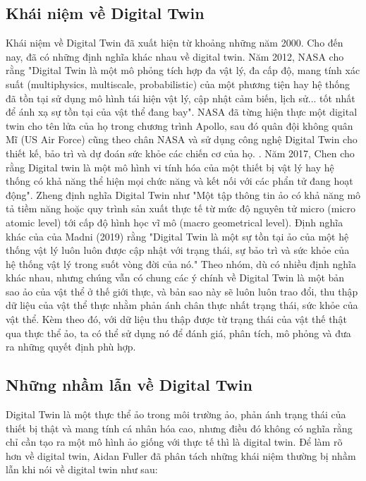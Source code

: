 \subsection{Khái niệm về Digital Twin}

Khái niệm về Digital Twin đã xuất hiện từ khoảng những năm 2000. Cho đến nay, đã có những định nghĩa khác nhau về digital twin. Năm 2012, NASA \cite{glaessgen2012digital} cho rằng "Digital Twin là một mô phỏng tích hợp đa vật lý, đa cấp độ, mang tính xác suất (multiphysics, multiscale, probabilistic) của một phương tiện hay hệ thống đã tồn tại sử dụng mô hình tái hiện vật lý, cập nhật cảm biến, lịch sử... tốt nhất để ánh xạ sự tồn tại của vật thể đang bay". NASA đã từng hiện thực một digital twin cho tên lửa của họ trong chương trình Apollo, sau đó quân đội không quân Mĩ (US Air Force) cũng theo chân NASA và sử dụng công nghệ Digital Twin cho thiết kế, bảo trì và dự đoán sức khỏe các chiến cơ của họ. \cite{singh_origin_to_future}. Năm 2017, Chen \cite{chen2017integrated} cho rằng Digital twin là một mô hình vi tính hóa của một thiết bị vật lý hay hệ thống có khả năng thể hiện mọi chức năng và kết nối với các phẩn tử đang hoạt động". Zheng \cite{zheng2019application} định nghĩa Digital Twin như "Một tập thông tin ảo có khả năng mô tả tiềm năng hoặc quy trình sản xuất thực tế từ mức độ nguyên tử micro (micro atomic level) tới cấp độ hình học vĩ mô (macro geometrical level). Định nghĩa khác của của Madni \cite{madni2019leveraging} (2019) rằng "Digital Twin là một sự tồn tại ảo của một hệ thống vật lý luôn luôn được cập nhật với trạng thái, sự bảo trì và sức khỏe của hệ thống vật lý trong suốt vòng đời của nó." Theo nhóm, dù có nhiều định nghĩa khác nhau, nhưng chúng vẫn có chung các ý chính về Digital Twin là một bản sao ảo của vật thể ở thế giới thực, và bản sao này sẽ luôn luôn trao đổi, thu thập dữ liệu của vật thể thực nhằm phản ánh chân thực nhất trạng thái, sức khỏe của vật thể. Kèm theo đó, với dữ liệu thu thập được từ trạng thái của vật thế thật qua thực thể ảo, ta có thể sử dụng nó để đánh giá, phân tích, mô phỏng và đưa ra những quyết định phù hợp.

\subsection{Những nhầm lẫn về Digital Twin}

Digital Twin là một thực thể ảo trong môi trường ảo, phản ánh trạng thái của thiết bị thật và mang tính cá nhân hóa cao, nhưng điều đó không có nghĩa rằng chỉ cần tạo ra một mô hình ảo giống với thực tế thì là digital twin. Để làm rõ hơn về digital twin, Aidan Fuller \cite{fuller_dt_tech_challenge_research} đã phân tách những khái niệm thường bị nhầm lẫn khi nói về digital twin như sau:

